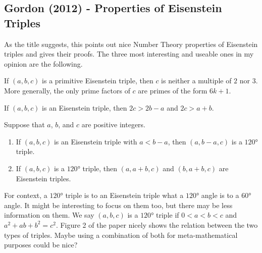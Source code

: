 \documentclass[12pt]{article}
\begin{document}
\subsection{Gordon (2012) - Properties of Eisenstein Triples}
As the title suggests, this points out nice Number Theory properties of Eisenstein triples and gives their proofs. The three most interesting and useable ones in my opinion are the following.
\begin{thm}{}{} %
    If $(a,b,c)$ is a primitive Eisenstein triple, then $c$ is neither a multiple of $2$ nor $3$. More generally, the only prime factors of $c$ are primes of the form $6k + 1$.
\end{thm}
\begin{thm}{}{}
    If $(a,b,c)$ is an Eisenstein triple, then $2c > 2b - a$ and $2c > a + b$.
\end{thm}
\begin{thm}{}{}
    Suppose that $a$, $b$, and $c$ are positive integers.
    \begin{enumerate}
        \item If $(a,b,c)$ is an Eisenstein triple with $a<b-a$, then $(a,b-a,c)$ is a $120°$ triple.
        \item If $(a,b,c)$ is a $120°$ triple, then $(a, a+b, c)$ and $(b,a+b,c)$ are Eisenstein triples.
    \end{enumerate}
\end{thm}
For context, a $120°$ triple is to an Eisenstein triple what a $120°$ angle is to a $60°$ angle. It might be interesting to focus on them too, but there may be less information on them. We say $(a,b,c)$ is a $120°$ triple if $0<a<b<c$ and $a^2 + ab + b^2 = c^2$. Figure 2 of the paper nicely shows the relation between the two types of triples. Maybe using a combination of both for meta-mathematical purposes could be nice?
\end{document}
